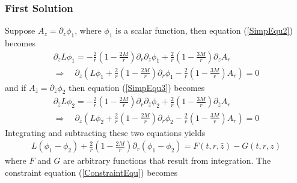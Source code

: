 \documentclass[12pt]{article}
\def\nn{\nonumber}
\begin{document}
\subsubsection{First Solution}
Suppose $A_{z} = \partial_{z} \phi_{1}$, where $\phi_{1}$ is a scalar function, then equation (\ref{SimpEqu2}) becomes
\begin{gather}
\partial_{z}
L
\phi_{1}
=
-
\frac{2}{r}
(1 - \frac{2 M}{r})
\partial_{r}
\partial_{z}
\phi_{1}
+
\frac{2}{r}
(1 - \frac{3 M}{r})
\partial_{z}
A_{r}
\nn \\
\Rightarrow
\quad
\partial_{z}
\left(
L
\phi_{1}
+
\frac{2}{r}
(1 - \frac{2 M}{r})
\partial_{r}
\phi_{1}
-
\frac{2}{r}
(1 - \frac{3 M}{r})
A_{r}\right)
=0
\label{Phi1Equ}
\end{gather}
and if $A_{\bar{z}} = \partial_{\bar{z}} \phi_{2}$ then equation (\ref{SimpEqu3}) becomes
\begin{gather}
\partial_{\bar{z}}
L
\phi_{2}
=
-
\frac{2}{r}
(1 - \frac{2 M}{r})
\partial_{r}
\partial_{\bar{z}}
\phi_{2}
+
\frac{2}{r}
(1 - \frac{3 M}{r})
\partial_{\bar{z}}
A_{r}
\nn \\
\Rightarrow
\quad
\partial_{\bar{z}}
\left(
L
\phi_{2}
+
\frac{2}{r}
(1 - \frac{2 M}{r})
\partial_{r}
\phi_{2}
-
\frac{2}{r}
(1 - \frac{3 M}{r})
A_{r}\right)
=0
\label{Phi2Equ}
\end{gather}
Integrating and subtracting these two equations yields
\begin{gather}
L(\phi_{1} - \phi_{2})
+
\frac{2}{r}
(1 - \frac{2 M}{r})
\partial_{r}
(\phi_{1} -\phi_{2})
=
F(t,r,\bar{z})
-
G(t,r,z)
\end{gather}
where $F$ and $G$ are arbitrary functions that result from integration. The constraint equation (\ref{ConstraintEqu}) becomes  
\end{document}
